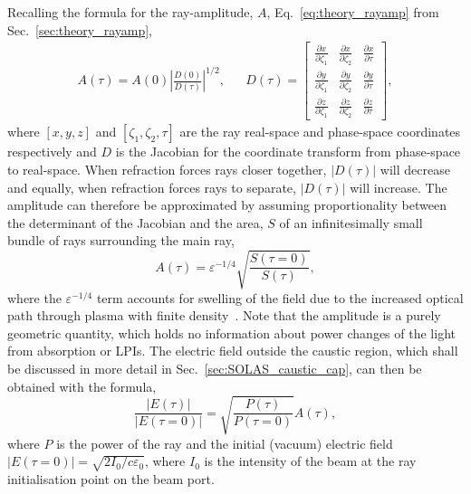 Recalling the formula for the ray-amplitude, $A$, Eq.~\ref{eq:theory_rayamp} from Sec.~\ref{sec:theory_rayamp},
\begin{align}
    A(\tau) = A(0)\left| \frac{D(0)}{D(\tau)} \right|^{1/2}, &&
    D(\tau) = 
    \begin{bmatrix}
        \frac{\partial x}{\partial \zeta_1} & \frac{\partial x}{\partial \zeta_2} & \frac{\partial x}{\partial \tau} \\
        \frac{\partial y}{\partial \zeta_1} & \frac{\partial y}{\partial \zeta_2} & \frac{\partial y}{\partial \tau} \\
        \frac{\partial z}{\partial \zeta_1} & \frac{\partial z}{\partial \zeta_2} & \frac{\partial z}{\partial \tau}
    \end{bmatrix},
\end{align}
where $[x,y,z]$ and $[\zeta_1,\zeta_2,\tau]$ are the ray real-space and phase-space coordinates respectively and $D$ is the Jacobian for the coordinate transform from phase-space to real-space.
When refraction forces rays closer together, $|D(\tau)|$ will decrease and equally, when refraction forces rays to separate, $|D(\tau)|$ will increase.
The amplitude can therefore be approximated by assuming proportionality between the determinant of the Jacobian and the area, $S$ of an infinitesimally small bundle of rays surrounding the main ray,
\begin{equation}
    A(\tau) = \varepsilon^{-1/4} \sqrt{\frac{S(\tau=0)}{S(\tau)}},
\end{equation}
where the $\varepsilon^{-1/4}$ term accounts for swelling of the field due to the increased optical path through plasma with finite density~\cite{follett_validation_2022}.
Note that the amplitude is a purely geometric quantity, which holds no information about power changes of the light from absorption or \ac{LPIs}.
The electric field outside the caustic region, which shall be discussed in more detail in Sec.~\ref{sec:SOLAS_caustic_cap}, can then be obtained with the formula,
\begin{equation}
    \frac{|E(\tau)|}{|E(\tau=0)|} = \sqrt{\frac{P(\tau)}{P(\tau=0)}}A(\tau),
\end{equation}
where $P$ is the power of the ray and the initial (vacuum) electric field $|E(\tau=0)|=\sqrt{2I_0/c \varepsilon_0}$, where $I_0$ is the intensity of the beam at the ray initialisation point on the beam port.

